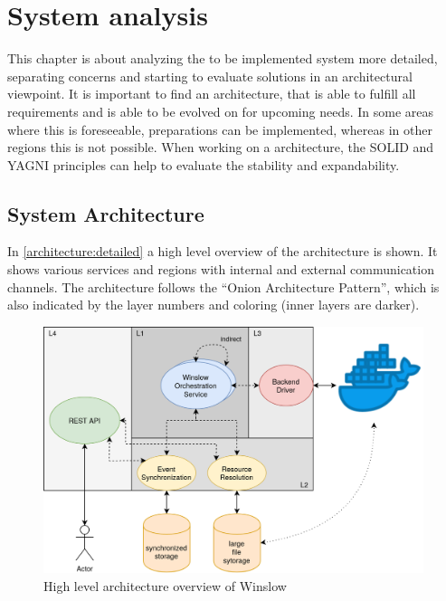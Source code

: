 
\chapter{System analysis}

This chapter is about analyzing the to be implemented system more detailed, separating concerns and starting to evaluate solutions in an architectural viewpoint.
It is important to find an architecture, that is able to fulfill all requirements and is able to be evolved on for upcoming needs.
In some areas where this is foreseeable, preparations can be implemented, whereas in other regions this is not possible.
When working on a architecture, the SOLID and YAGNI principles can help to evaluate the stability and expandability.




\pagebreak
\section{System Architecture}

In \autoref{architecture:detailed} a high level overview of the architecture is shown.
It shows various services and regions with internal and external communication channels.
The architecture follows the \enquote{Onion Architecture Pattern}, which is also indicated by the layer numbers and coloring (inner layers are darker).


\begin{figure}[H]
	\includegraphics[width=0.99\textwidth]{architecture_detailed.png}
	\centering
	\caption{High level architecture overview of Winslow}
	\label{architecture:detailed}
\end{figure}

